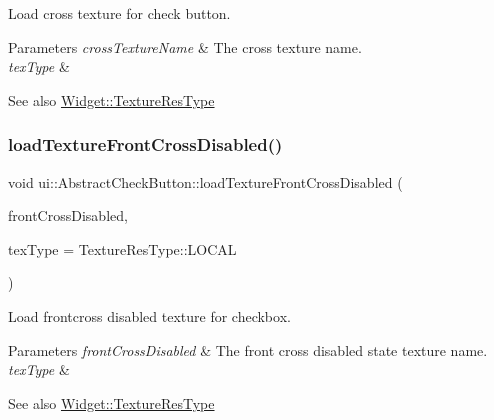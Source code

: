 Load cross texture for check button.


\begin{DoxyParams}{Parameters}
{\em cross\+Texture\+Name} & The cross texture name. \\
\hline
{\em tex\+Type} & \\
\hline
\end{DoxyParams}
\begin{DoxySeeAlso}{See also}
{\ttfamily \hyperlink{classui_1_1Widget_a040a65ec5ad3b11119b7e16b98bd9af0}{Widget\+::\+Texture\+Res\+Type}} 
\end{DoxySeeAlso}
\mbox{\label{classui_1_1AbstractCheckButton_a6434adf3966aa318552301fbdd32e6b2}} 
\subsubsection{\texorpdfstring{load\+Texture\+Front\+Cross\+Disabled()}{loadTextureFrontCrossDisabled()}\hspace{0.1cm}{\footnotesize\ttfamily [1/2]}}
{\footnotesize\ttfamily void ui\+::\+Abstract\+Check\+Button\+::load\+Texture\+Front\+Cross\+Disabled (\begin{DoxyParamCaption}\item[{const std\+::string \&}]{front\+Cross\+Disabled,  }\item[{\hyperlink{classui_1_1Widget_a040a65ec5ad3b11119b7e16b98bd9af0}{Texture\+Res\+Type}}]{tex\+Type = {\ttfamily TextureResType\+:\+:LOCAL} }\end{DoxyParamCaption})}

Load frontcross disabled texture for checkbox.


\begin{DoxyParams}{Parameters}
{\em front\+Cross\+Disabled} & The front cross disabled state texture name. \\
\hline
{\em tex\+Type} & \\
\hline
\end{DoxyParams}
\begin{DoxySeeAlso}{See also}
{\ttfamily \hyperlink{classui_1_1Widget_a040a65ec5ad3b11119b7e16b98bd9af0}{Widget\+::\+Texture\+Res\+Type}} 
\end{DoxySeeAlso}
\mbox{\label{classui_1_1AbstractCheckButton_a6434adf3966aa318552301fbdd32e6b2}} 
